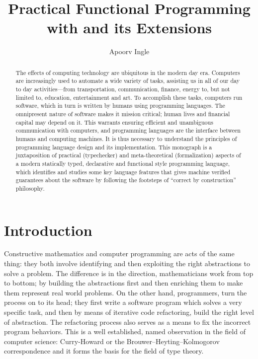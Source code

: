 \documentclass[screen,nonacm]{acmart}
\title{Practical Functional Programming with \SFC and its Extensions}
\author{Apoorv Ingle}
\affiliation{%
  \institution{University of Iowa} \department{Department of Computer Science} \streetaddress{McLean Hall} \city{Iowa City} \state{Iowa} \country{USA}}
\begin{document}
\begin{abstract}
  The effects of computing technology are ubiquitous in the modern day
  era. Computers are increasingly used to automate a wide variety of
  tasks, assisting us in all of our day to day activities---from
  transportation, communication, finance,
  energy to, but not limited to, education, entertainment and
  art. To accomplish these tasks, computers run software, which in turn is written by
  humans using programming languages. The omnipresent nature of software
  makes it mission critical; human lives and financial capital may
  depend on it. This warrants ensuring efficient and unambiguous communication
  with computers, and programming languages are the interface between humans and
  computing machines. It is thus necessary to understand the principles of
  programming language design and its implementation.
  This monograph is a juxtaposition of practical
  (typechecker) and meta-theoretical (formalization) aspects of a
  modern statically typed, declarative and functional style programming
  language, which identifies and studies some
  key language features that gives machine verified guarantees about the
  software by following the footsteps of ``correct by
  construction'' philosophy.
\end{abstract}

\maketitle
\section{Introduction}\label{sec:introduction}
Constructive mathematics and computer programming are acts of
the same thing: they both involve identifying and then exploiting the right
abstractions to solve a problem. The difference is in the direction,
mathematicians work from top to bottom; by building the abstractions
first and then enriching them to make them represent real world
problems. On the other hand, programmers, turn the process on to its
head; they first write a software program which solves a very specific
task, and then by means of iterative code refactoring, build the right
level of abstraction. The refactoring process also serves as a means
to fix the incorrect program behaviors. This is a well established,
named observation in the field of computer science: Curry-Howard or the
Brouwer–Heyting–Kolmogorov correspondence\cite{wadler_propositions_2015,han_deep_2023}
and it forms the basis for the field of type theory\cite{barendregt_lambda_2013,hottbook_2013,nordstrom_programming_1990}.
\end{document}
